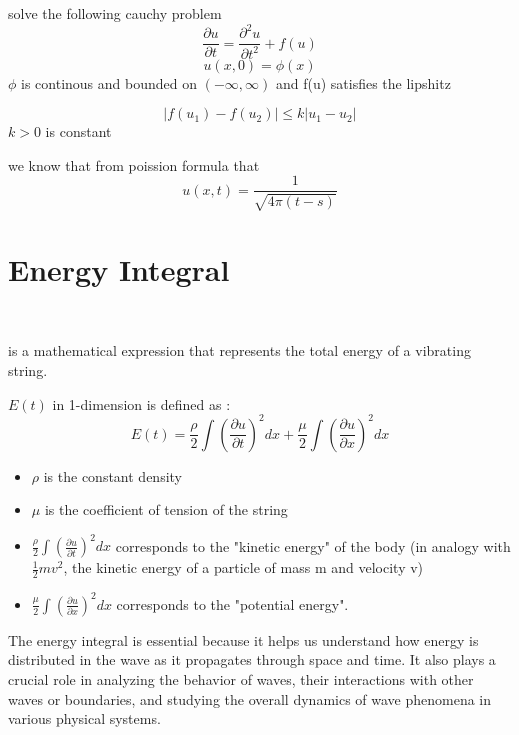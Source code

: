 \documentclass[]{article}
\begin{document}
solve the following cauchy problem 
\[
\frac{\partial u}{\partial t} = \frac{\partial^2 u}{\partial t^2} + f(u)
\]
\[
u(x,0) = \phi(x)
\]
$\phi$ is continous and bounded on $(-\infty,\infty)$ and f(u) satisfies the lipshitz 

\[
|f(u_1)-f(u_2)| \leq k |u_1-u_2| 
\]
$k>0$ is constant 

we know that from poission formula that 
\[
u(x,t) = \frac{1}{\sqrt{4\pi (t-s)}} 
\]






\newpage

\section{Energy Integral}
\
\begin{definition} 
    is a mathematical expression that represents the total energy of a vibrating string.
\end{definition}
$E(t)$ in 1-dimension is defined as :
\[
E(t)  =  \frac{\rho}{2} \int {\left(\frac{\partial u}{\partial t}\right)}^2 dx + \frac{\mu}{2} \int {\left(\frac{\partial u}{\partial x}\right)}^2 dx
\] 
\begin{itemize}
    \item $\rho$ is the constant density
    \item $\mu$ is the coefficient of tension of the string
    \item $\displaystyle \frac{\rho}{2} \int {\left(\frac{\partial u}{\partial t}\right)}^2 dx $ corresponds to the "kinetic energy" of the body (in analogy with $\frac{1}{2}mv^2$, the kinetic energy of a particle of mass m and velocity v)
    \item $\displaystyle \frac{\mu}{2} \int {\left(\frac{\partial u}{\partial x}\right)}^2 dx $ corresponds to the "potential energy".
\end{itemize}

The energy integral is essential because it helps us understand how energy is distributed in the wave as it propagates through space and time. It also plays a crucial role in analyzing the behavior of waves, their interactions with other waves or boundaries, and studying the overall dynamics of wave phenomena in various physical systems.
\end{document}
